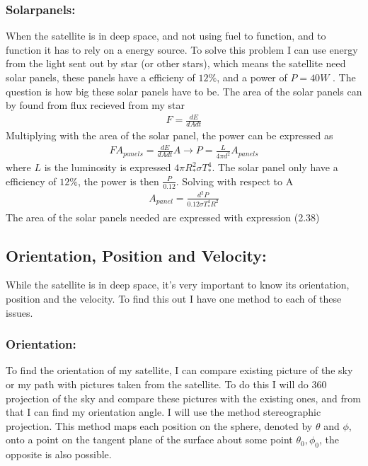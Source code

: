 \documentclass[a4paper,11pt,english]{report}
\begin{document}
\subsubsection{Solarpanels:} When the satellite is in deep space, and not using
fuel to function, and to function it has to rely on a energy source. To solve
this problem I can use energy from the light sent out by star (or other stars),
which means the satellite need solar panels, these panels have a efficieny of
\(12\%\), and a power of \(P = 40W\) . The question is how big these solar
panels have to be. The area of
the solar panels can by found from flux recieved from my star
\begin{align}
  F = \frac{dE}{dAdt}
\end{align}
Multiplying with the area of the solar panel, the power can be expressed as
\begin{align}
  FA_{panels} = \frac{dE}{dAdt}A \to P = \frac{L}{4\pi d^{2}}A_{panels}
\end{align}
where \(L\) is the luminosity is expressed \(4\pi R_{*}^{2}\sigma T^{4}_{*}\).
The solar panel only have a efficiency of \(12\%\), the power is then \(\frac{P}{0.12}\).
Solving with respect to A
\begin{align}
  A_{panel} = \frac{d^{2}P}{0.12\sigma T^{4}_{*}R^{2}}
\end{align}
The area of the solar panels needed are expressed with expression (2.38)
\newpage
\subsection{Orientation, Position and Velocity:}
While the satellite is in deep space, it's very important to know
its orientation, position and the velocity. To find this out I have one method
to each of these issues.
\subsubsection{Orientation:} To find the orientation of my satellite,  I can compare existing
picture of the sky or my path with pictures taken from the satellite. To do
this I will do 360 projection of the sky and compare these pictures with the
existing ones, and from that I can find my orientation angle.
I will use the method stereographic projection. This method 
maps each position on the sphere, denoted by
\(\theta\) and \(\phi\), onto a point on the tangent plane of the surface about
some point \(\theta_{0}, \phi_{0}\), the opposite is  also possible.
\end{document}
